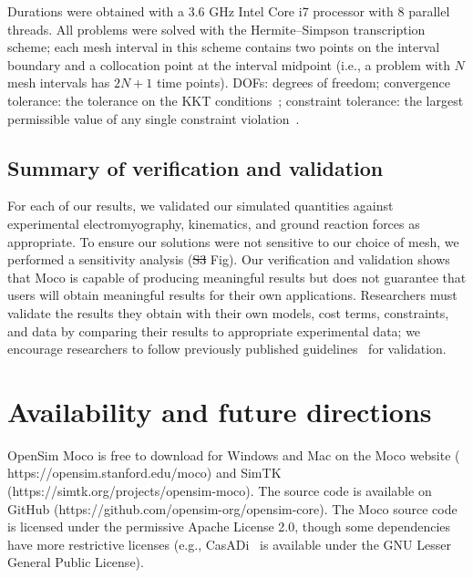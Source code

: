 \documentclass[10pt,letterpaper]{article}
\providecommand{\DIFaddtex}[1]{{\protect\color{blue}\uwave{#1}}} %
\providecommand{\DIFdeltex}[1]{{\protect\color{red}\sout{#1}}}                      %
\providecommand{\DIFaddbegin}{} %
\providecommand{\DIFaddend}{} %
\providecommand{\DIFdelbegin}{} %
\providecommand{\DIFdelend}{} %
\providecommand{\DIFadd}[1]{\texorpdfstring{\DIFaddtex{#1}}{#1}} %
\providecommand{\DIFdel}[1]{\texorpdfstring{\DIFdeltex{#1}}{}} %
\newcommand{\DIFscaledelfig}{0.5}
\newlength{\DIFdelgraphicswidth} %
\newlength{\DIFdelgraphicsheight} %
\newcommand{\DIFaddincludegraphics}[2][]{{\color{blue}\fbox{\DIFOincludegraphics[#1]{#2}}}} %
\newcommand{\DIFdelincludegraphics}[2][]{%
\sbox{\DIFdelgraphicsbox}{\DIFOincludegraphics[#1]{#2}}%
\settoboxwidth{\DIFdelgraphicswidth}{\DIFdelgraphicsbox} %
\settoboxtotalheight{\DIFdelgraphicsheight}{\DIFdelgraphicsbox} %
\scalebox{\DIFscaledelfig}{%
\parbox[b]{\DIFdelgraphicswidth}{\usebox{\DIFdelgraphicsbox}\\[-\baselineskip] \rule{\DIFdelgraphicswidth}{0em}}\llap{\resizebox{\DIFdelgraphicswidth}{\DIFdelgraphicsheight}{%
\setlength{\unitlength}{\DIFdelgraphicswidth}%
\begin{picture}(1,1)%
\thicklines\linethickness{2pt} %
{\color[rgb]{1,0,0}\put(0,0){\framebox(1,1){}}}%
{\color[rgb]{1,0,0}\put(0,0){\line( 1,1){1}}}%
{\color[rgb]{1,0,0}\put(0,1){\line(1,-1){1}}}%
\end{picture}%
}\hspace*{3pt}}} %
} %
\DeclareRobustCommand{\DIFaddbegin}{\DIFOaddbegin \let\includegraphics\DIFaddincludegraphics} %
\DeclareRobustCommand{\DIFaddend}{\DIFOaddend \let\includegraphics\DIFOincludegraphics} %
\DeclareRobustCommand{\DIFdelbegin}{\DIFOdelbegin \let\includegraphics\DIFdelincludegraphics} %
\DeclareRobustCommand{\DIFdelend}{\DIFOaddend \let\includegraphics\DIFOincludegraphics} %
\begin{document}
\begin{table}[!ht]
\begin{adjustwidth}{-2.25in}{0in}
        \begin{flushleft}
            Durations were obtained with a
            3.6 GHz Intel Core i7 processor with 8 parallel threads.
            All problems were solved with the Hermite--Simpson transcription scheme;
            each mesh interval in this scheme contains two points on the interval boundary
            and a collocation point at the interval midpoint (i.e., a problem with $N$ mesh intervals has $2N + 1$ time points). DOFs: degrees of freedom;
convergence tolerance: the tolerance on the KKT conditions~\cite{Betts:2010}; constraint tolerance: the largest permissible value of any single constraint violation~\cite{Wachter:2006}.
        \end{flushleft}
        \label{tab:durations}
    \end{adjustwidth}
\end{table}

\subsection*{Summary of verification and validation}

For each of our results, we validated our simulated quantities against experimental electromyography, kinematics, and ground reaction forces as appropriate. To ensure our solutions were not sensitive to our choice of mesh, we performed a sensitivity analysis (\DIFdelbegin \DIFdel{S3 }\DIFdelend \DIFaddbegin \DIFadd{S2 }\DIFaddend Fig). Our verification and validation shows that Moco is capable of producing meaningful results but does not guarantee that users will obtain meaningful results for their own applications. Researchers must validate the results they obtain with their own models, cost terms, constraints, and data by comparing their results to appropriate experimental data; we encourage researchers to follow previously published guidelines~\cite{Hicks:2015bo} for validation.

\section*{Availability and future directions}

OpenSim Moco is free to download for Windows and Mac on the Moco website (\\https://opensim.stanford.edu/moco) and SimTK (https://simtk.org/projects/opensim-moco). The source code is available on GitHub (https://github.com/opensim-org/opensim-core). The Moco source code is licensed under the permissive Apache License 2.0, though some dependencies have more restrictive licenses (e.g., CasADi~\cite{Andersson:2019} is available under the GNU Lesser General Public License).
\end{document}
